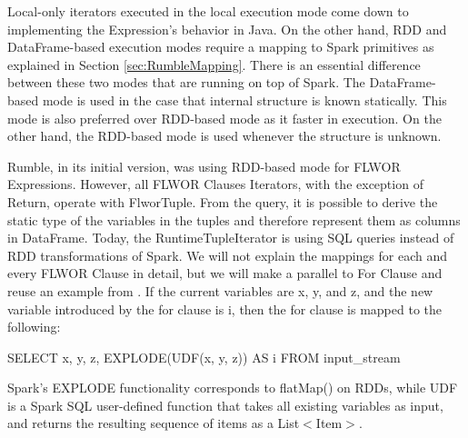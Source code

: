 Local-only iterators executed in the local execution mode come down to implementing the Expression's behavior in Java. On the other hand, RDD and DataFrame-based execution modes require a mapping to Spark primitives as explained in Section \ref{sec:RumbleMapping}. There is an essential difference between these two modes that are running on top of Spark. The DataFrame-based mode is used in the case that internal structure is known statically. This mode is also preferred over RDD-based mode as it faster in execution. On the other hand, the RDD-based mode is used whenever the structure is unknown. 

Rumble, in its initial version, was using RDD-based mode for FLWOR Expressions. However, all FLWOR Clauses Iterators, with the exception of Return, operate with FlworTuple. From the query, it is possible to derive the static type of the variables in the tuples and therefore represent them as columns in DataFrame. Today, the RuntimeTupleIterator is using SQL queries instead of RDD transformations of Spark. We will not explain the mappings for each and every FLWOR Clause in detail, but we will make a parallel to For Clause and reuse an example from \cite{RumblePaper}. If the current variables are x, y, and z, and the new variable introduced by the for clause is i, then the for clause is mapped to the following:

SELECT x, y, z, EXPLODE(UDF(x, y, z)) AS i FROM input\_stream

Spark’s EXPLODE functionality corresponds to flatMap() on RDDs, while UDF is a Spark SQL user-defined function that takes all existing variables as input, and returns the resulting sequence of items as a List$<$Item$>$.

